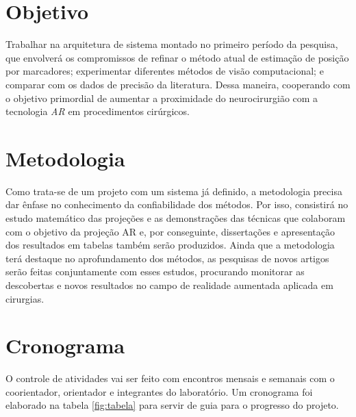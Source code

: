 \section{Objetivo}

Trabalhar na arquitetura de sistema montado no primeiro período da pesquisa, que envolverá os compromissos de refinar o método atual de estimação de posição por marcadores; experimentar diferentes métodos de visão computacional; e comparar com os dados de precisão da literatura. Dessa maneira, cooperando com o objetivo primordial de aumentar a proximidade do neurocirurgião com a tecnologia \textit{AR} em procedimentos cirúrgicos.  

\section{Metodologia}

Como trata-se de um projeto com um sistema já definido, a metodologia precisa dar ênfase no conhecimento da confiabilidade dos métodos. Por isso, consistirá no estudo matemático das projeções e as demonstrações das técnicas que colaboram com o objetivo da projeção AR e, por conseguinte, dissertações e apresentação dos resultados em tabelas também serão produzidos. Ainda que a metodologia terá destaque no aprofundamento dos métodos, as pesquisas de novos artigos serão feitas conjuntamente com esses estudos, procurando monitorar as descobertas e novos resultados no campo de realidade aumentada aplicada em cirurgias.

\newpage

\section{Cronograma}

O controle de atividades vai ser feito com encontros mensais e semanais com o coorientador, orientador e integrantes do laboratório. Um cronograma foi elaborado na tabela \ref{fig:tabela} para servir de guia para o progresso do projeto.

